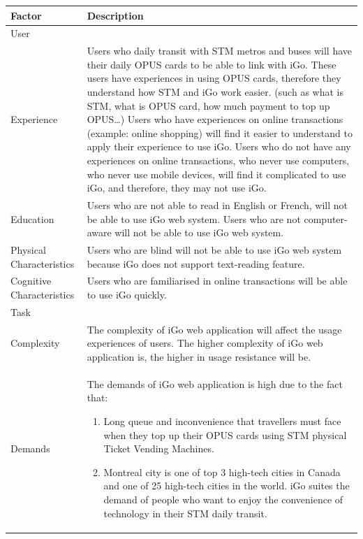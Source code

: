 \documentclass[11pt, english]{article}
\begin{document}
\setlength{\tabcolsep}{18pt}
\renewcommand{\arraystretch}{1.5}
\begin{tabular}[H]{ |p{3cm}|p{12cm}| }
\hline
Factor   & Description  \\
\hline
User &   \\
\hline
Experience & 
Users who daily transit with STM metros and buses will have their daily OPUS cards to be able to link with iGo. These users have experiences in using OPUS cards, therefore they understand how STM and iGo work easier. (such as what is STM, what is OPUS card, how much payment to top up OPUS…)
Users who have experiences on online transactions (example: online shopping) will find it easier to understand to apply their experience to use iGo.
Users who do not have any experiences on online transactions, who never use computers, who never use mobile devices, will find it complicated to use iGo, and therefore, they may not use iGo.
    \\
\hline
Education &
Users who are not able to read in English or French, will not be able to use iGo web system.
Users who are not computer-aware will not be able to use iGo web system.
 \\
 \hline
Physical Characteristics    &
Users who are blind will not be able to use iGo web system because iGo does not support text-reading feature.
  \\
  \hline
Cognitive Characteristics & 
Users who are familiarised in online transactions will be able to use iGo quickly.
  \\
 \hline
Task &  \\
\hline
Complexity & 
The complexity of iGo web application will affect the usage experiences of users. The higher complexity of iGo web application is, the higher in usage resistance will be.
  \\
\hline
Demands &

The demands of iGo web application is high due to the fact that:
\begin{enumerate}
    \item Long queue and inconvenience that travellers must face when they top up their OPUS cards using STM physical Ticket Vending Machines.
    \item Montreal city is one of top 3 high-tech cities in Canada and one of 25 high-tech cities in the world. iGo suites the demand of people who want to enjoy the convenience of technology in their STM daily transit.\cite{tech_city}
\end{enumerate} \\
\hline 
\end{tabular}
\\ 
\end{document}

